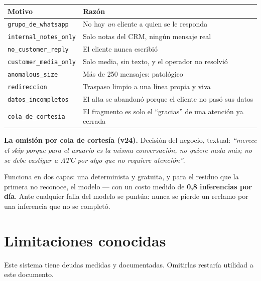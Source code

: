 \documentclass[11pt,a4paper]{article}
\newcommand{\cod}[1]{\texttt{\small #1}}
\begin{document}
\begin{center}
\begin{tabularx}{\textwidth}{@{}lX@{}}
\toprule
\textbf{Motivo} & \textbf{Razón} \\
\midrule
\cod{grupo\_de\_whatsapp} & No hay \emph{un} cliente a quien se le responda \\
\cod{internal\_notes\_only} & Solo notas del CRM, ningún mensaje real \\
\cod{no\_customer\_reply} & El cliente nunca escribió \\
\cod{customer\_media\_only} & Solo media, sin texto, y el operador no resolvió \\
\cod{anomalous\_size} & Más de 250 mensajes: patológico \\
\cod{redireccion} & Traspaso limpio a una línea propia y viva \\
\cod{datos\_incompletos} & El alta se abandonó porque el cliente no pasó sus datos \\
\cod{cola\_de\_cortesia} & El fragmento es solo el ``gracias'' de una atención ya cerrada \\
\bottomrule
\end{tabularx}
\end{center}

\begin{nota}
\textbf{La omisión por cola de cortesía (v24).} Decisión del negocio, textual:
\emph{``merece el skip porque para el usuario es la misma conversación, no quiere nada
más; no se debe castigar a ATC por algo que no requiere atención''}.

Funciona en dos capas: una determinista y gratuita, y para el residuo que la primera
no reconoce, el modelo --- con un costo medido de \textbf{0,8 inferencias por día}.
Ante cualquier falla del modelo se puntúa: nunca se pierde un reclamo por una
inferencia que no se completó.
\end{nota}

\newpage
\section{Limitaciones conocidas}

Este sistema tiene deudas medidas y documentadas. Omitirlas restaría utilidad a este
documento.
\end{document}
